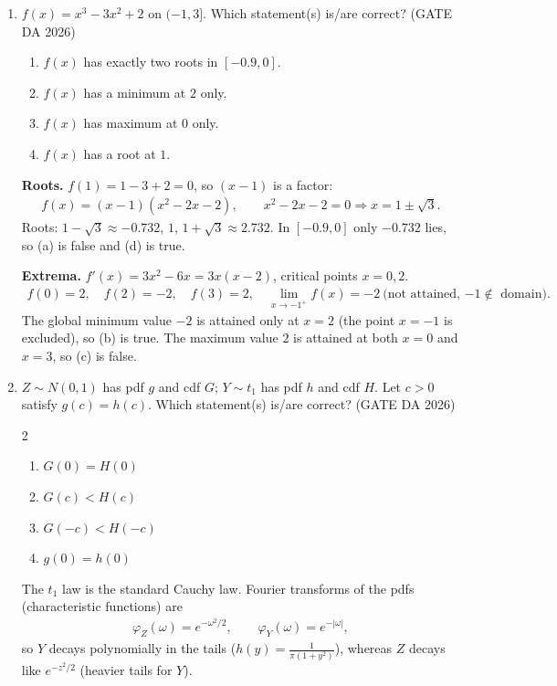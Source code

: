 \begin{enumerate}[label=\textbf{Q.\arabic*},leftmargin=*,start=1]
\item[\textbf{Q.27}] $f(x)=x^3-3x^2+2$ on $(-1,3]$. Which statement(s) is/are
correct?
\hfill (GATE DA 2026)
\begin{enumerate}[label=(\alph*),itemsep=0pt]
 \item $f(x)$ has exactly two roots in $[-0.9,0]$.
 \item $f(x)$ has a minimum at $2$ only.
 \item $f(x)$ has maximum at $0$ only.
 \item $f(x)$ has a root at $1$.
\end{enumerate}
\solution
\textbf{Roots.} $f(1)=1-3+2=0$, so $(x-1)$ is a factor:
\begin{align}
f(x)=(x-1)(x^2-2x-2),\qquad x^2-2x-2=0\Rightarrow x=1\pm\sqrt3 .
\end{align}
Roots: $1-\sqrt3\approx-0.732$, $1$, $1+\sqrt3\approx2.732$. In $[-0.9,0]$ only
$-0.732$ lies, so (a) is false and (d) is true.

\textbf{Extrema.} $f'(x)=3x^2-6x=3x(x-2)$, critical points $x=0,2$.
\begin{align}
f(0)=2,\quad f(2)=-2,\quad f(3)=2,\quad \lim_{x\to-1^+}f(x)=-2\ \text{(not attained, $-1\notin$ domain)}.
\end{align}
The global minimum value $-2$ is attained only at $x=2$ (the point $x=-1$ is excluded),
so (b) is true. The maximum value $2$ is attained at both $x=0$ and $x=3$, so (c) is false.

\item[\textbf{Q.28}] $Z\sim N(0,1)$ has pdf $g$ and cdf $G$; $Y\sim t_1$ has pdf
$h$ and cdf $H$. Let $c>0$ satisfy $g(c)=h(c)$. Which statement(s) is/are correct?
\hfill (GATE DA 2026)
\begin{multicols}{2}
\begin{enumerate}[label=(\alph*),itemsep=0pt]
 \item $G(0)=H(0)$ \item $G(c)<H(c)$ \item $G(-c)<H(-c)$ \item $g(0)=h(0)$
\end{enumerate}
\end{multicols}
\solution
The $t_1$ law is the standard Cauchy law. Fourier transforms of the pdfs
(characteristic functions) are
\begin{align}
\varphi_Z(\omega)=e^{-\omega^2/2},\qquad \varphi_Y(\omega)=e^{-|\omega|},
\end{align}
so $Y$ decays polynomially in the tails ($h(y)=\frac1{\pi(1+y^2)}$), whereas $Z$ decays
like $e^{-z^2/2}$ (heavier tails for $Y$).


\end{enumerate}
